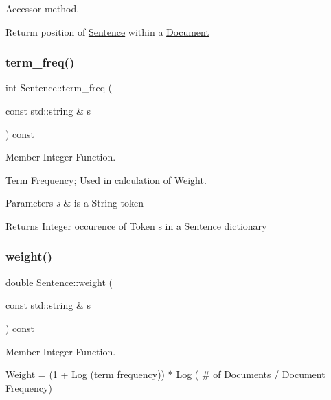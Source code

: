 Accessor method. 

Returm position of \hyperlink{class_sentence}{Sentence} within a \hyperlink{class_document}{Document} \mbox{\label{class_sentence_aa615a21b45de69ba4a1f0fa257a85ccd}} 
\subsubsection{\texorpdfstring{term\+\_\+freq()}{term\_freq()}}
{\footnotesize\ttfamily int Sentence\+::term\+\_\+freq (\begin{DoxyParamCaption}\item[{const std\+::string \&}]{s }\end{DoxyParamCaption}) const\hspace{0.3cm}{\ttfamily [private]}}



Member Integer Function. 

Term Frequency; Used in calculation of Weight.


\begin{DoxyParams}{Parameters}
{\em s} & is a String token \\
\hline
\end{DoxyParams}
\begin{DoxyReturn}{Returns}
Integer occurence of Token s in a \hyperlink{class_sentence}{Sentence} dictionary 
\end{DoxyReturn}
\mbox{\label{class_sentence_ac7084c1822710975f94ed8a30ac73c2c}} 
\subsubsection{\texorpdfstring{weight()}{weight()}}
{\footnotesize\ttfamily double Sentence\+::weight (\begin{DoxyParamCaption}\item[{const std\+::string \&}]{s }\end{DoxyParamCaption}) const\hspace{0.3cm}{\ttfamily [private]}}



Member Integer Function. 

Weight = (1 + Log (term frequency)) $\ast$ Log ( \# of Documents / \hyperlink{class_document}{Document} Frequency)


